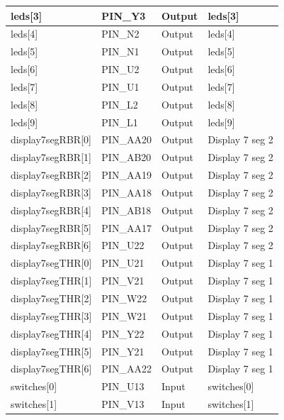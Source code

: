 \documentclass[12pt, a4paper]{article}
\begin{document}
\begin{table}[H]
\begin{center}
\begin{tabular}{|l|l|l|l|}
				leds{[}3{]}           & PIN\_Y3   & Output & leds{[}3{]}      \\ \hline
				leds{[}4{]}           & PIN\_N2   & Output & leds{[}4{]}      \\ \hline
				leds{[}5{]}           & PIN\_N1   & Output & leds{[}5{]}      \\ \hline
				leds{[}6{]}           & PIN\_U2   & Output & leds{[}6{]}      \\ \hline
				leds{[}7{]}           & PIN\_U1   & Output & leds{[}7{]}      \\ \hline
				leds{[}8{]}           & PIN\_L2   & Output & leds{[}8{]}      \\ \hline
				leds{[}9{]}           & PIN\_L1   & Output & leds{[}9{]}      \\ \hline
				display7segRBR{[}0{]} & PIN\_AA20 & Output & Display 7 seg 2  \\ \hline
				display7segRBR{[}1{]} & PIN\_AB20 & Output & Display 7 seg 2  \\ \hline
				display7segRBR{[}2{]} & PIN\_AA19 & Output & Display 7 seg 2  \\ \hline
				display7segRBR{[}3{]} & PIN\_AA18 & Output & Display 7 seg 2  \\ \hline
				display7segRBR{[}4{]} & PIN\_AB18 & Output & Display 7 seg 2  \\ \hline
				display7segRBR{[}5{]} & PIN\_AA17 & Output & Display 7 seg 2  \\ \hline
				display7segRBR{[}6{]} & PIN\_U22  & Output & Display 7 seg 2  \\ \hline
				display7segTHR{[}0{]} & PIN\_U21  & Output & Display 7 seg 1  \\ \hline
				display7segTHR{[}1{]} & PIN\_V21  & Output & Display 7 seg 1  \\ \hline
				display7segTHR{[}2{]} & PIN\_W22  & Output & Display 7 seg 1  \\ \hline
				display7segTHR{[}3{]} & PIN\_W21  & Output & Display 7 seg 1  \\ \hline
				display7segTHR{[}4{]} & PIN\_Y22  & Output & Display 7 seg 1  \\ \hline
				display7segTHR{[}5{]} & PIN\_Y21  & Output & Display 7 seg 1  \\ \hline
				display7segTHR{[}6{]} & PIN\_AA22 & Output & Display 7 seg 1  \\ \hline
				switches{[}0{]}       & PIN\_U13  & Input  & switches{[}0{]}  \\ \hline
				switches{[}1{]}       & PIN\_V13  & Input  & switches{[}1{]}  \\ \hline

\end{tabular}
\end{center}
\end{table}
\end{document}

